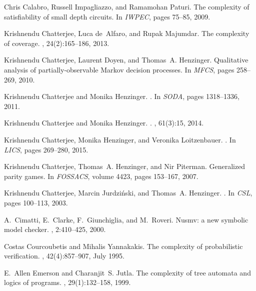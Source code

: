 \documentclass[11pt,letterpaper]{article}
\begin{document}
\begin{thebibliography}{10}
Chris Calabro, Russell Impagliazzo, and Ramamohan Paturi.
\newblock The complexity of satisfiability of small depth circuits.
\newblock In {\em {IWPEC}}, pages 75--85, 2009.

Krishnendu Chatterjee, Luca de~Alfaro, and Rupak Majumdar.
\newblock The complexity of coverage.
, 24(2):165--186, 2013.

Krishnendu Chatterjee, Laurent Doyen, and Thomas~A. Henzinger.
\newblock Qualitative analysis of partially-observable {M}arkov decision
  processes.
\newblock In {\em {MFCS}}, pages 258--269, 2010.

Krishnendu Chatterjee and Monika Henzinger.
.
\newblock In {\em SODA}, pages 1318--1336, 2011.

Krishnendu Chatterjee and Monika Henzinger.
.
, 61(3):15, 2014.

Krishnendu Chatterjee, Monika Henzinger, and Veronika Loitzenbauer.
.
\newblock In {\em LICS}, pages 269--280, 2015.

Krishnendu Chatterjee, Thomas~A. Henzinger, and Nir Piterman.
\newblock Generalized parity games.
\newblock In {\em FOSSACS}, volume 4423, pages 153--167, 2007.

Krishnendu Chatterjee, Marcin Jurdziński, and Thomas~A. Henzinger.
.
\newblock In {\em CSL}, pages 100--113, 2003.

A.~Cimatti, E.~Clarke, F.~Giunchiglia, and M.~Roveri.
\newblock Nusmv: a new symbolic model checker.
, 2:410--425, 2000.

Costas Courcoubetis and Mihalis Yannakakis.
\newblock The complexity of probabilistic verification.
, 42(4):857--907, July 1995.

E.~Allen Emerson and Charanjit~S. Jutla.
\newblock The complexity of tree automata and logics of programs.
, 29(1):132--158, 1999.


\end{thebibliography}
\end{document}

